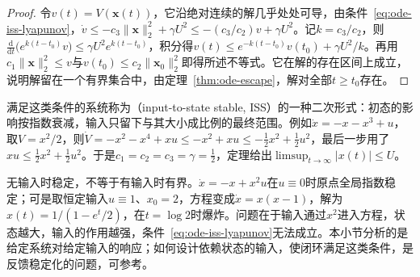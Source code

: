 \begin{proof}
  令$v(t)=V(\bm x(t))$，它沿绝对连续的解几乎处处可导，由条件~\eqref{eq:ode-iss-lyapunov}，$\dot v\leq-c_3\|\bm x\|_2^2+\gamma U^2\leq-(c_3/c_2)v+\gamma U^2$。记$k=c_3/c_2$，则$\frac{\mathrm d}{\mathrm dt}\bigl(e^{k(t-t_0)}v\bigr)\leq\gamma U^2e^{k(t-t_0)}$，积分得$v(t)\leq e^{-k(t-t_0)}v(t_0)+\gamma U^2/k$。再用$c_1\|\bm x\|_2^2\leq v$与$v(t_0)\leq c_2\|\bm x_0\|_2^2$即得所述不等式。它在解的存在区间上成立，说明解留在一个有界集合中，由定理~\ref{thm:ode-escape}，解对全部$t\geq t_0$存在。
\end{proof}

满足这类条件的系统称为（input-to-state stable, ISS）的一种二次形式：初态的影响按指数衰减，输入只留下与其大小成比例的最终范围。例如$\dot x=-x-x^3+u$，取$V=x^2/2$，则$\dot V=-x^2-x^4+xu\leq-x^2+xu\leq-\tfrac12x^2+\tfrac12u^2$，最后一步用了$xu\leq\tfrac12x^2+\tfrac12u^2$。于是$c_1=c_2=c_3=\gamma=\tfrac12$，定理给出$\limsup_{t\to\infty}|x(t)|\leq U$。

无输入时稳定，不等于有输入时有界。$\dot x=-x+x^2u$在$u\equiv0$时原点全局指数稳定；可是取恒定输入$u\equiv1$、$x_0=2$，方程变成$\dot x=x(x-1)$，解为$x(t)=1/(1-e^t/2)$，在$t=\log2$时爆炸。问题在于输入通过$x^2$进入方程，状态越大，输入的作用越强，条件~\eqref{eq:ode-iss-lyapunov}无法成立。本小节分析的是给定系统对给定输入的响应；如何设计依赖状态的输入，使闭环满足这类条件，是反馈稳定化的问题，可参考。
